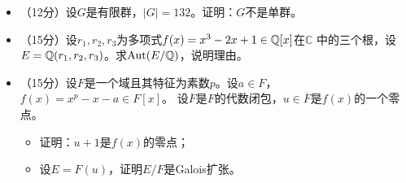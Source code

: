 \begin{itemize}
\item[（四）]（12分）设$G$是有限群，$|G|=132$。证明：$G$不是单群。

\item[（五）]（15分）设$r_1,r_2,r_3$为多项式$f(x)=x^3-2x+1\in\mathbb{Q}[x]$在$\mathbb{C}$
中的三个根，设$E=\mathbb{Q}(r_1,r_2,r_3)$。求$\operatorname{Aut}(E/\mathbb{Q})$，说明理由。

\item[（六）]（15分）设$F$是一个域且其特征为素数$p$。设$a\in F$，$f(x)=x^p-x-a\in F[x]$。
设$\overline{F}$是$F$的代数闭包，$u\in\overline{F}$是$f(x)$的一个零点。
\begin{itemize}
    \item[(i)] 证明：$u+1$是$f(x)$的零点；
    \item[(ii)] 设$E=F(u)$，证明$E/F$是Galois扩张。
\end{itemize}
\end{itemize}